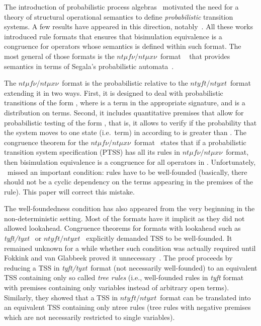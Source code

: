 \documentclass[submission,copyright,creativecommons]{eptcs}
\newcommand{\ntmufnu}{\ensuremath{\textit{nt}\mu\textit{f}\nu}}
\newcommand{\ntmuxnu}{\ensuremath{\textit{nt}\mu\textit{x}\nu}}
\newcommand{\ntmufxnu}{\ensuremath{\ntmufnu\textit{/}\ntmuxnu}}
\newcommand{\ntyft}{\ensuremath{\textit{ntyft}}}
\newcommand{\ntyxt}{\ensuremath{\textit{ntyxt}}}
\newcommand{\ntyfxt}{\ensuremath{\ntyft\textit{/}\ntyxt}}
\begin{document}
The introduction of probabilistic process
algebras~\cite[etc.]{DBLP:journals/iandc/BaetenBS95,DBLP:journals/iandc/GlabbeekSS95}
motivated the need for a theory of structural operational semantics to
define \emph{probabilistic} transition systems.
A few results have appeared in this direction,
notably~\cite{DBLP:journals/entcs/Bartels02,Bartels2004,DBLP:journals/tocl/LanotteT09,klin2008structural,DL-fossacs12}.
All these works introduced rule formats that ensures that bisimulation
equivalence is a congruence for operators whose semantics is defined
within such format.
The most general of those formats is the \ntmufxnu\ format ~\cite{DL-fossacs12} that provides semantics in terms of Segala's probabilistic automata~\cite{Segala95}.

\pagebreak[4]

The \ntmufxnu\ format is the probabilistic relative to the
\ntyfxt\ format~\cite{Groote93} extending it in two ways.  First,
it is designed to deal with probabilistic transitions of the form
, where  is a term in the appropriate signature, and
 is a distribution on terms. Second, it includes quantitative
premises that allow for probabilistic testing of the form
, that is, it allows to verify if the
probability that the system moves to one state (i.e.\ term) in
 according to  is greater than .
The congruence theorem for the
\ntmufxnu\ format~\cite[Thm.~12]{DL-fossacs12} states that if a
probabilistic transition system specification (PTSS)  has all its
rules in \ntmufxnu\ format, then bisimulation equivalence is a
congruence for all operators in .
Unfortunately, \cite{DL-fossacs12}~missed an important condition:
rules have to be well-founded (basically, there should not be a cyclic
dependency on the terms appearing in the premises of the rule).
This paper will correct this mistake.

The well-foundedness condition has also appeared from the very beginning
in the non-deterministic setting.  Most of the formats have it
implicit as they did not allowed lookahead.  Congruence theorems for
formats with lookahead such as
\textit{tyft/tyxt}~\cite{GrooteVaandrager92} or
\ntyfxt~\cite{Groote93} explicitly demanded TSS to be well-founded.
It remained unknown for a while whether such condition was actually
required until Fokkink and van Glabbeek proved it
unnecessary~\cite{FokkinkvanGlabbeek96}.
The proof proceeds by reducing a TSS in \textit{tyft/tyxt}~format (not
necessarily well-founded) to an equivalent TSS containing only so
called \emph{tree rules} (i.e., well-founded rules in \textit{tyft}
format with premises containing only variables instead of
arbitrary open terms).  Similarly, they showed that a TSS in
\ntyfxt\ format can be translated into an equivalent TSS containing
only ntree rules (tree rules with negative premises which are not
necessarily restricted to single variables).
\end{document}
